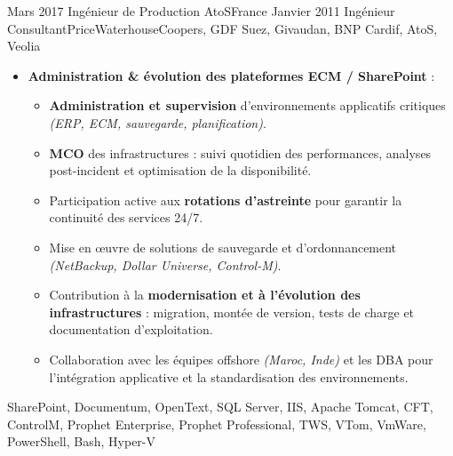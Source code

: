 \begin{experiences}
\emptySeparator
\emptySeparator

\consultantexperience
    {Mars 2017}       {Ingénieur de Production }{AtoS}{France}
    {Janvier 2011}    {Ingénieur Consultant}{PriceWaterhouseCoopers, GDF Suez, Givaudan, BNP Cardif, AtoS, Veolia} {
        \begin{itemize}[left=0pt,label={},itemsep=0.4em]
          \vspace{0.3em}
          \item \textbf{Administration \& évolution des plateformes ECM / SharePoint} :
            \begin{itemize}[itemsep=0.15em,topsep=0.1em,parsep=0pt]
              \small
              \item \textbf{Administration et supervision} d’environnements applicatifs critiques \emph{(ERP, ECM, sauvegarde, planification)}.
              \item \textbf{MCO} des infrastructures : suivi quotidien des performances, analyses post-incident et optimisation de la disponibilité.
              \item Participation active aux \textbf{rotations d’astreinte} pour garantir la continuité des services 24/7.
              \item Mise en œuvre de solutions de sauvegarde et d’ordonnancement \emph{(NetBackup, Dollar Universe, Control-M)}.
              \item Contribution à la \textbf{modernisation et à l’évolution des infrastructures} : migration, montée de version, tests de charge et documentation d’exploitation.
              \item Collaboration avec les équipes offshore \emph{(Maroc, Inde)} et les DBA pour l’intégration applicative et la standardisation des environnements.
            \end{itemize}
          \vspace{0.3em}

        \end{itemize} %
    }
    {SharePoint, Documentum, OpenText, SQL Server, IIS, Apache Tomcat, CFT, ControlM, Prophet Enterprise, Prophet Professional, TWS, VTom, VmWare, PowerShell, Bash, Hyper-V}
\emptySeparator



\end{experiences}
